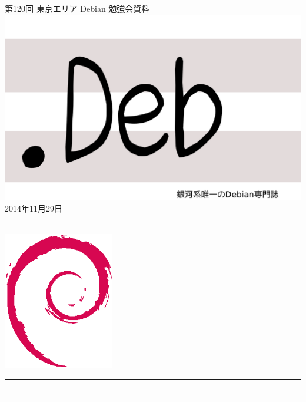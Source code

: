 \documentclass[mingoth,a4paper]{jsarticle}
\newcommand{\debmtgyear}{2014}
\newcommand{\debmtgmonth}{11}
\newcommand{\debmtgdate}{29}
\newcommand{\debmtgnumber}{120}
\begin{document}
\begin{titlepage}
\thispagestyle{empty}

\vspace*{-2cm}
第\debmtgnumber{}回 東京エリア Debian 勉強会資料\\
\hspace*{-2cm}
\includegraphics{image2012-natsu/dotdeb.pdf}\\
\hfill{}\debmtgyear{}年\debmtgmonth{}月\debmtgdate{}日

\\

\vspace*{-2cm}
\hfill{}\includegraphics[height=6cm]{image200502/openlogo-nd.eps}
\end{titlepage}

\newpage

\begin{minipage}[b]{0.2\hsize}
 \colorbox{titleback}{}
\end{minipage}
\begin{minipage}[b]{0.8\hsize}
\hrule
\vspace{2mm}
\hrule
\begin{multicols}{2}
\tableofcontents
\end{multicols}
\vspace{2mm}
\hrule
\end{minipage}
\end{document}
